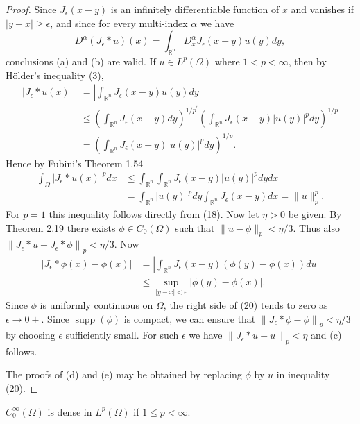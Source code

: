 \begin{proof}
  Since $J_\epsilon(x-y)$ is an infinitely differentiable function of $x$ and vanishes if $|y-x| \geq \epsilon$, and since for every multi-index $\alpha$ we have
  \[
  D^\alpha\left(J_\epsilon * u\right)(x)=\int_{\mathbb{R}^n} D_x^\alpha J_\epsilon(x-y) u(y) d y,
  \]
  conclusions (a) and (b) are valid.
  If $u \in L^p(\Omega)$ where $1<p<\infty$, then by Hölder's inequality (3),
  \[
  \begin{aligned}
  \left|J_\epsilon * u(x)\right| & =\left|\int_{\mathbb{R}^n} J_\epsilon(x-y) u(y) d y\right| \\
  & \leq\left(\int_{\mathbb{R}^n} J_\epsilon(x-y) d y\right)^{1 / p^{\prime}}\left(\int_{\mathbb{R}^n} J_\epsilon(x-y)|u(y)|^p d y\right)^{1 / p} \\
  & =\left(\int_{\mathbb{R}^n} J_\epsilon(x-y)|u(y)|^p d y\right)^{1 / p} .
  \end{aligned}
  \]
  Hence by Fubini's Theorem 1.54
  \[
  \begin{aligned}
  \int_{\Omega}\left|J_\epsilon * u(x)\right|^p d x & \leq \int_{\mathbb{R}^n} \int_{\mathbb{R}^n} J_\epsilon(x-y)|u(y)|^p d y d x \\
  & =\int_{\mathbb{R}^n}|u(y)|^p d y \int_{\mathbb{R}^n} J_\epsilon(x-y) d x=\|u\|_p^p .
  \end{aligned}
  \]
  For $p=1$ this inequality follows directly from (18).
  Now let $\eta>0$ be given. By Theorem 2.19 there exists $\phi \in C_0(\Omega)$ such that $\|u-\phi\|_p<\eta / 3$. Thus also $\left\|J_\epsilon * u-J_\epsilon * \phi\right\|_p<\eta / 3$. Now
  \[
  \begin{aligned}
  \left|J_\epsilon * \phi(x)-\phi(x)\right| & =\left|\int_{\mathbb{R}^n} J_\epsilon(x-y)(\phi(y)-\phi(x)) d u\right| \\
  & \leq \sup _{|y-x|<\epsilon}|\phi(y)-\phi(x)| .
  \end{aligned}
  \]
  Since $\phi$ is uniformly continuous on $\Omega$, the right side of (20) tends to zero as $\epsilon \rightarrow 0+$. Since $\operatorname{supp}(\phi)$ is compact, we can ensure that $\left\|J_\epsilon * \phi-\phi\right\|_p<\eta / 3$
  by choosing $\epsilon$ sufficiently small. For such $\epsilon$ we have $\left\|J_\epsilon * u-u\right\|_p<\eta$ and (c) follows.
  
  The proofs of (d) and (e) may be obtained by replacing $\phi$ by $u$ in inequality (20).
\end{proof}

\begin{corollary}
  $C_0^{\infty}(\Omega)$ is dense in $L^p(\Omega)$ if $1 \leq p<\infty$.
\end{corollary}

